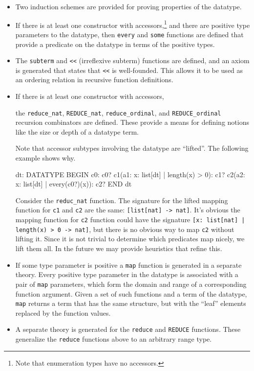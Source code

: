 \begin{itemize}
\item Two induction schemes are provided for proving properties of the
datatype.

\item If there is at least one constructor with accessors,\footnote{Note
that enumeration types have no accessors.}  and there are positive type
parameters to the datatype, then \texttt{every} and \texttt{some}
functions are defined that provide a predicate on the datatype in terms of
the positive types.

\item The \texttt{subterm} and \texttt{<<} (irreflexive subterm) functions
are defined, and an axiom is generated that states that \texttt{<<} is
well-founded.  This allows it to be used as an ordering relation in
recursive function definitions.

\item If there is at least one constructor with
accessors,\addtocounter{footnote}{-1}\footnotemark{} the
\texttt{reduce\_nat}, \texttt{REDUCE\_nat}, \texttt{reduce\_ordinal}, and
\texttt{REDUCE\_ordinal} recursion combinators are defined.  These provide
a means for defining notions like the size or depth of a datatype term.

Note that accessor subtypes involving the datatype are
``lifted''.  The following example shows why.
\begin{pvsex}
  dt: DATATYPE
   BEGIN
    c0: c0?
    c1(a1: \setb{}x: list[dt] | length(x) > 0\sete): c1?
    c2(a2: \setb{}x: list[dt] | every(c0?)(x)\sete): c2?
   END dt
\end{pvsex}
Consider the \texttt{reduc\_nat} function.  The signature for the lifted
mapping function for \texttt{c1} and \texttt{c2} are the same:
\texttt{[list[nat] -> nat]}.  It's obvious the mapping function for
\texttt{c2} function could have the signature \texttt{[\setb{}x: list[nat]
| length(x) > 0\sete{} -> nat]}, but there is no obvious way to map
\texttt{c2} without lifting it.  Since it is not trivial to determine
which predicates map nicely, we lift them all.  In the future we may
provide heuristics that refine this.

\item If some type parameter is positive a \texttt{map} function is
generated in a separate theory.  Every positive type parameter in the
datatype is associated with a pair of \texttt{map} parameters, which form
the domain and range of a corresponding function argument.  Given a set of
such functions and a term of the datatype, \texttt{map} returns a term
that has the same structure, but with the ``leaf'' elements replaced by
the function values.

\item A separate theory is generated for the \texttt{reduce} and
\texttt{REDUCE} functions.  These generalize the \texttt{reduce} functions
above to an arbitrary range type.

\end{itemize}

